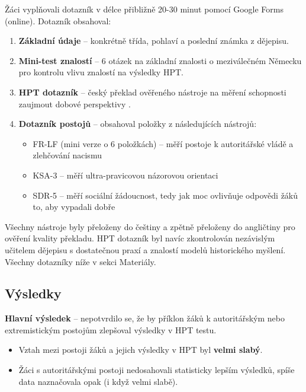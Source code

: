 \documentclass[
  12pt,
  english,
  a4paper,
  extrafontsizes,onecolumn,openright
  ]{memoir}
\providecommand{\tightlist}{%
  \setlength{\itemsep}{0pt}\setlength{\parskip}{0pt}}
\begin{document}
Žáci vyplňovali dotazník v délce přibližně 20-30 minut pomocí Google Forms (online). Dotazník obsahoval:

\begin{enumerate}
\def\labelenumi{\arabic{enumi}.}
\tightlist
\item
  \textbf{Základní údaje} -- konkrétně třída, pohlaví a poslední známka z dějepisu.
\item
  \textbf{Mini-test znalostí} -- 6 otázek na základní znalosti o meziválečném Německu pro kontrolu vlivu znalostí na výsledky HPT.
\item
  \textbf{HPT dotazník} -- český překlad ověřeného nástroje na měření schopnosti zaujmout dobové perspektivy \autocite{Hartmann_Hasselhorn2008Historical}.
\item
  \textbf{Dotazník postojů} -- obsahoval položky z následujících nástrojů:

  \begin{itemize}
  \tightlist
  \item
    FR-LF (mini verze o 6 položkách) -- měří postoje k autoritářské vládě a zlehčování nacismu \autocite{Decker_et_al2013Rechtsextremismus}
  \item
    KSA-3 -- měří ultra-pravicovou názorovou orientaci \autocite{Beierlein_et_al2014Die_Kurzskala,Nießen_et_al2019An_English}
  \item
    SDR-5 -- měří sociální žádoucnost, tedy jak moc ovlivňuje odpovědi žáků to, aby vypadali dobře \autocite{Hays_et_al1989A_Five}
  \end{itemize}
\end{enumerate}

Všechny nástroje byly přeloženy do češtiny a zpětně přeloženy do angličtiny pro ověření kvality překladu. HPT dotazník byl navíc zkontrolován nezávislým učitelem dějepisu s dostatečnou praxí a znalostí modelů historického myšlení. Všechny dotazníky níže v sekci Materiály.

\subsection{Výsledky}\label{vuxfdsledky}

\textbf{Hlavní výsledek} -- nepotvrdilo se, že by příklon žáků k autoritářským nebo extremistickým postojům zlepšoval výsledky v HPT testu.

\begin{itemize}
\tightlist
\item
  Vztah mezi postoji žáků a jejich výsledky v HPT byl \textbf{velmi slabý}.
\item
  Žáci s autoritářskými postoji nedosahovali statisticky lepším výsledků, spíše data naznačovala opak (i když velmi slabě).
\end{itemize}
\end{document}
